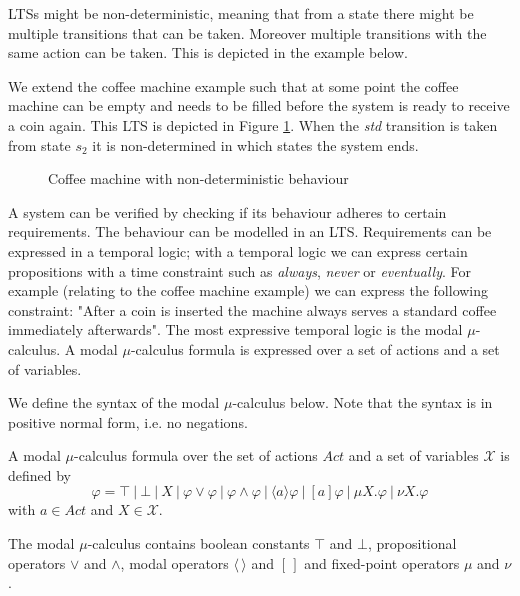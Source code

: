LTSs might be non-deterministic, meaning that from a state there might be multiple transitions that can be taken. Moreover multiple transitions with the same action can be taken. This is depicted in the example below.

\begin{example}
	We extend the coffee machine example such that at some point the coffee machine can be empty and needs  to be filled before the system is ready to receive a coin again. This LTS is depicted in Figure \ref{fig:coffeemachineundeterministic}. When the \textit{std} transition is taken from state $s_2$ it is non-determined in which states the system ends.
	\begin{figure}[h]
		\centering
		\caption[Coffee machine LTS]{Coffee machine with non-deterministic behaviour}
		\label{fig:coffeemachineundeterministic}
	\end{figure}
\end{example}


A system can be verified by checking if its behaviour adheres to certain requirements. The behaviour can be modelled in an LTS. Requirements can be expressed in a temporal logic; with a temporal logic we can express certain propositions with a time constraint such as \textit{always}, \textit{never} or \textit{eventually}. For example (relating to the coffee machine example) we can express the following constraint: "After a coin is inserted the machine always serves a standard coffee immediately afterwards". The most expressive temporal logic is the modal $\mu$-calculus. A modal $\mu$-calculus formula is expressed over a set of actions and a set of variables.

We define the syntax of the modal $\mu$-calculus below. Note that the syntax is in positive normal form, i.e. no negations.
\begin{definition}
	\label{def_mu_syntax}
	A modal $\mu$-calculus formula over the set of actions $Act$ and a set of variables $\mathcal{X}$ is defined by
	\[ \varphi = \top\ |\ \bot\ |\ X\ |\ \varphi \vee \varphi\ |\ \varphi \wedge \varphi\ |\ \langle a \rangle \varphi\ |\ [a]\varphi\ |\ \mu X.\varphi\ |\ \nu X.\varphi \]
	with $a \in Act$ and $X \in \mathcal{X}$. 
\end{definition}
The modal $\mu$-calculus contains boolean constants $\top$ and $\bot$, propositional operators $\vee$ and $\wedge$, modal operators $\langle \, \rangle$ and $[ \, ]$ and fixed-point operators $\mu$ and $\nu$. 

